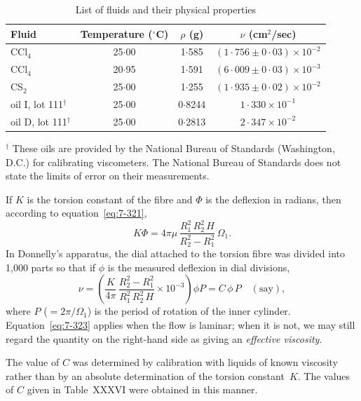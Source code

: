 \begin{table}[ht]
\centering
\caption{List of fluids and their physical properties}
\label{tab:XXXVII}
\medskip
\begin{tabular}{lccc}
\hline
Fluid & Temperature (${}^{\circ}$C) & $\rho$ (g) & $\nu$ (cm$^2$/sec) \\
\hline
CCl$_4$                          & 25$\cdot$00 & 1$\cdot$585 & $(1{\cdot}756 \pm 0{\cdot}03) \times 10^{-2}$ \\
CCl$_4$                          & 20$\cdot$95 & 1$\cdot$591 & $(6{\cdot}009 \pm 0{\cdot}03) \times 10^{-3}$ \\
CS$_2$                           & 25$\cdot$00 & 1$\cdot$255 & $(1{\cdot}935 \pm 0{\cdot}02) \times 10^{-2}$ \\
oil I, lot 111$^{\dag}$          & 25$\cdot$00 & 0$\cdot$8244 & $1{\cdot}330 \times 10^{-1}$ \\
oil D, lot 111$^{\dag}$          & 25$\cdot$00 & 0$\cdot$2813 & $2{\cdot}347 \times 10^{-2}$ \\
\hline
\end{tabular}

\smallskip
{\footnotesize $^{\dag}$ These oils are provided by the National Bureau of Standards (Washington, D.C.)
for calibrating viscometers. The National Bureau of Standards does not state the limits
of error on their measurements.}
\end{table}

If $K$ is the torsion constant of the fibre and $\Phi$ is the deflexion in radians,
then according to equation~\eqref{eq:7-321},
\begin{equation}\label{eq:7-322}
K\Phi = 4\pi\mu\,\frac{R_1^2\,R_2^2\,H}{R_2^2 - R_1^2}\,\Omega_1.
\end{equation}
In Donnelly's apparatus, the dial attached to the torsion fibre was
divided into 1,000 parts so that if $\phi$ is the measured deflexion in dial
divisions,
\begin{equation}\label{eq:7-323}
\nu = \left(\frac{K}{4\pi}\,\frac{R_2^2 - R_1^2}{R_1^2\,R_2^2\,H} \times 10^{-3}\right)\phi P
= C\,\phi\,P \quad (\text{say}),
\end{equation}
where $P$ ($= 2\pi/\Omega_1$) is the period of rotation of the inner cylinder.
Equation~\eqref{eq:7-323} applies when the flow is laminar; when it is not, we may
still regard the quantity on the right-hand side as giving an \textit{effective
viscosity}.

The value of $C$ was determined by calibration with liquids of known
viscosity rather than by an absolute determination of the torsion
constant~$K$.  The values of $C$ given in Table~XXXVI were obtained in
this manner.

